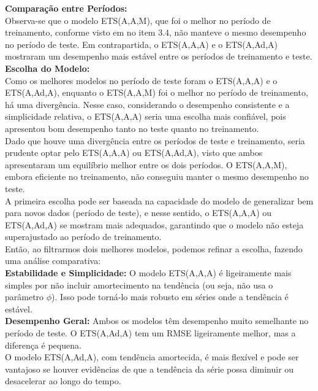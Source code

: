 \documentclass[a4paper, 12pt]{article}
\begin{document}
\textbf{Comparação entre Períodos:}\\

Observa-se que o modelo ETS(A,A,M), que foi o melhor no período de treinamento, conforme visto em no item 3.4, não manteve o mesmo desempenho no período de teste. Em contrapartida, o ETS(A,A,A) e o ETS(A,Ad,A) mostraram um desempenho mais estável entre os períodos de treinamento e teste.\\


\textbf{Escolha do Modelo:}\\

Como os melhores modelos no período de teste foram o ETS(A,A,A) e o ETS(A,Ad,A), enquanto o ETS(A,A,M) foi o melhor no período de treinamento, há uma divergência. Nesse caso, considerando o desempenho consistente e a simplicidade relativa, o ETS(A,A,A) seria uma escolha mais confiável, pois apresentou bom desempenho tanto no teste quanto no treinamento.\\
Dado que houve uma divergência entre os períodos de teste e treinamento, seria prudente optar pelo ETS(A,A,A) ou ETS(A,Ad,A), visto que ambos apresentaram um equilíbrio melhor entre os dois períodos. O ETS(A,A,M), embora eficiente no treinamento, não conseguiu manter o mesmo desempenho no teste.\\

A primeira escolha pode ser baseada na capacidade do modelo de generalizar bem para novos dados (período de teste), e nesse sentido, o ETS(A,A,A) ou ETS(A,Ad,A) se mostram mais adequados, garantindo que o modelo não esteja superajustado ao período de treinamento.\\

Então, ao filtrarmos dois melhores modelos, podemos refinar a escolha, fazendo uma análise comparativa:\\

\textbf{Estabilidade e Simplicidade:} O modelo ETS(A,A,A) é ligeiramente mais simples por não incluir amortecimento na tendência (ou seja, não usa o parâmetro $\phi$). Isso pode torná-lo mais robusto em séries onde a tendência é estável.\\

\textbf{Desempenho Geral:} Ambos os modelos têm desempenho muito semelhante no período de teste. O ETS(A,Ad,A) tem um RMSE ligeiramente melhor, mas a diferença é pequena.\\

O modelo ETS(A,Ad,A), com tendência amortecida, é mais flexível e pode ser vantajoso se houver evidências de que a tendência da série possa diminuir ou desacelerar ao longo do tempo.\\
\end{document}
